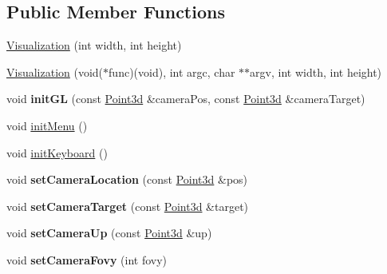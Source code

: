 \subsection*{Public Member Functions}
\begin{DoxyCompactItemize}
\item 
\hyperlink{classCartWheel_1_1Visualization_a8150cffbeaa2415d4d650a426e719578}{Visualization} (int width, int height)
\item 
\hyperlink{classCartWheel_1_1Visualization_acea06ec4f96949dd446f34309fdd1f70}{Visualization} (void($\ast$func)(void), int argc, char $\ast$$\ast$argv, int width, int height)
\item 
\hypertarget{classCartWheel_1_1Visualization_acee215c42766103da7d9b7d442fbb065}{
void {\bfseries initGL} (const \hyperlink{classCartWheel_1_1Math_1_1Point3d}{Point3d} \&cameraPos, const \hyperlink{classCartWheel_1_1Math_1_1Point3d}{Point3d} \&cameraTarget)}
\label{classCartWheel_1_1Visualization_acee215c42766103da7d9b7d442fbb065}

\item 
void \hyperlink{classCartWheel_1_1Visualization_a07bb39cd884397b5be514ce2aa24ead5}{initMenu} ()
\item 
void \hyperlink{classCartWheel_1_1Visualization_a7f2f823f35e7533e696b615912a2b02b}{initKeyboard} ()
\item 
\hypertarget{classCartWheel_1_1Visualization_ab45b71b65d75caff434a06577784d569}{
void {\bfseries setCameraLocation} (const \hyperlink{classCartWheel_1_1Math_1_1Point3d}{Point3d} \&pos)}
\label{classCartWheel_1_1Visualization_ab45b71b65d75caff434a06577784d569}

\item 
\hypertarget{classCartWheel_1_1Visualization_a822688aea0299265a57db1879ba1d378}{
void {\bfseries setCameraTarget} (const \hyperlink{classCartWheel_1_1Math_1_1Point3d}{Point3d} \&target)}
\label{classCartWheel_1_1Visualization_a822688aea0299265a57db1879ba1d378}

\item 
\hypertarget{classCartWheel_1_1Visualization_a61cb4e5487c1ef4846ad032f55967b24}{
void {\bfseries setCameraUp} (const \hyperlink{classCartWheel_1_1Math_1_1Point3d}{Point3d} \&up)}
\label{classCartWheel_1_1Visualization_a61cb4e5487c1ef4846ad032f55967b24}

\item 
\hypertarget{classCartWheel_1_1Visualization_a11afac1fb5d58a1886cfdf2afe6840dd}{
void {\bfseries setCameraFovy} (int fovy)}
\label{classCartWheel_1_1Visualization_a11afac1fb5d58a1886cfdf2afe6840dd}


\end{DoxyCompactItemize}
